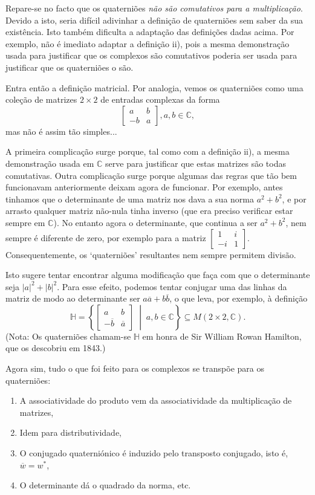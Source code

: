 \documentclass{article}
\newcommand{\C}{\mathbb{C}}
\renewcommand{\H}{\mathbb{H}}
\begin{document}
Repare-se no facto que os quaterniões \emph{não são comutativos para a multiplicação}. Devido a isto, seria difícil adivinhar a definição de quaterniões sem saber da sua existência. Isto também dificulta a adaptação das definições dadas acima. Por exemplo, não é imediato adaptar a definição ii), pois a mesma demonstração usada para justificar que os complexos são comutativos poderia ser usada para justificar que os quaterniões o são.

Entra então a definição matricial. Por analogia, vemos os quaterniões como uma coleção de matrizes $2 \times 2$ de entradas complexas da forma
\[\begin{bmatrix} a & b \\ -b & a \end{bmatrix}, a, b \in \C,\]
mas não é assim tão simples...

A primeira complicação surge porque, tal como com a definição ii),  a mesma demonstração usada em $\C$ serve para justificar que estas matrizes são todas comutativas. Outra complicação surge porque algumas das regras que tão bem funcionavam anteriormente deixam agora de funcionar. Por exemplo, antes tinhamos que o determinante de uma matriz nos dava a sua norma $a^2 + b^2$, e por arrasto qualquer matriz não-nula tinha inverso (que era preciso verificar estar sempre em $\C$). No entanto agora o determinante, que continua a ser $a^2 + b^2$, nem sempre é diferente de zero, por exemplo para a matriz $\begin{bmatrix} 1 & i \\ -i & 1 \end{bmatrix}$. Consequentemente, os `quaterniões' resultantes nem sempre permitem divisão.

Isto sugere tentar encontrar alguma modificação que faça com que o determinante seja $\lvert a \rvert^2 + \lvert b \rvert^2$. Para esse efeito, podemos tentar conjugar uma das linhas da matriz de modo ao determinante ser $a \overline{a} + b \overline{b}$, o que leva, por exemplo, à definição
\[\H = \left\{ \begin{bmatrix} a & b \\ -\overline{b} & \overline{a} \end{bmatrix} \;\middle|\; a, b \in \C \right\} \subseteq M(2 \times 2, \C).\]
(Nota: Os quaterniões chamam-se $\H$ em honra de Sir William Rowan Hamilton, que os descobriu em 1843.)

Agora sim, tudo o que foi feito para os complexos se transpõe para os quaterniões:
\begin{enumerate}[label=\roman*)]
\item A associatividade do produto vem da associatividade da multiplicação de matrizes,
\item Idem para distributividade,
\item O conjugado quaterniónico é induzido pelo transposto conjugado, isto é, $\overline{w} = w^*$,
\item O determinante dá o quadrado da norma, etc.
\end{enumerate}
\end{document}
